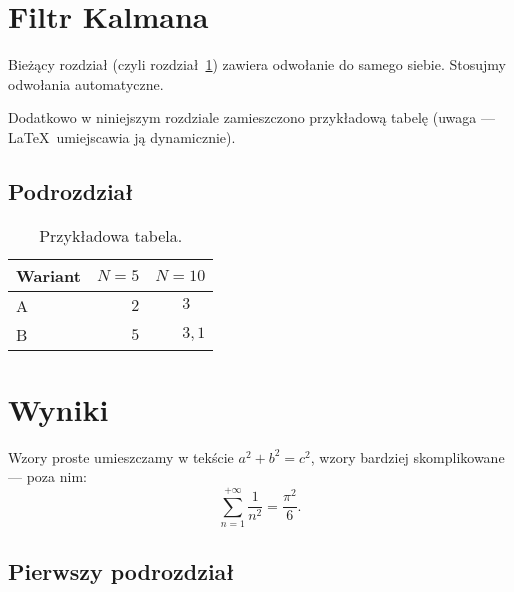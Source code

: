 \documentclass[12pt,a4paper,twoside,openany]{book}
\begin{document}
\chapter{Filtr Kalmana}
\label{sec:kalm}

Bieżący rozdział (czyli rozdział~\ref{sec:kalm}) zawiera odwołanie do samego siebie. Stosujmy odwołania automatyczne.

Dodatkowo w niniejszym rozdziale zamieszczono przykładową tabelę (uwaga --- \LaTeX\ umiejscawia ją dynamicznie).
\section{Podrozdział}


\begin{table}[h]
\centering
\caption{Przykładowa tabela.}
\label{tab:przyklad}
\footnotesize
\begin{tabular}{|l|r|r|}
\hline
Wariant & $N=5$ & $N=10$\\
\hline
A & $2$ & $3\phantom{{,}1}$ \\
B & $5$ & $3{,}1$ \\

\hline
\end{tabular} 
\end{table}

\clearpage

\chapter{Wyniki}
\label{sec:wyniki}

Wzory proste umieszczamy w tekście $a^2+b^2=c^2$, wzory bardziej skomplikowane --- poza nim:
\begin{equation}
\sum_{n=1}^{+\infty}\frac{1}{n^2}=\frac{\pi^2}{6}.
\end{equation}

\section{Pierwszy podrozdział}
\end{document}
